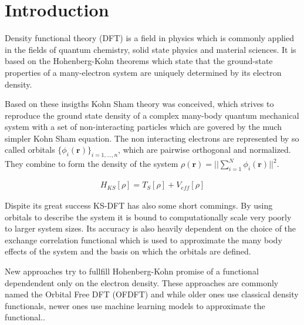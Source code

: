 \chapter{Introduction}

Density functional theory (DFT) is a field in physics which is commonly applied in the fields of quantum chemistry,
solid state physics and material sciences. It is based on the Hohenberg-Kohn theorems \cite{hohenberg_inhomogeneous_1964} which state that the ground-state properties of a many-electron system are uniquely determined by its electron density.

Based on these insigths Kohn Sham theory was conceived, which strives to reproduce the ground state
density of a complex many-body quantum mechanical system with a set of non-interacting particles which are govered by the much simpler Kohn Sham equation. The non interacting electrons are represented by so called orbitals $\{\phi_i (\mathbf{r})\}_{i=1,...,n}$, which are pairwise orthogonal and normalized. They combine to form the density of the system $\rho(\mathbf{r}) = || \sum\limits_{i=1}^N \phi_i(\mathbf{r})||^2$.

\begin{align}
    H_{KS}[\rho ]  = T_S [\rho] + V_{eff}[\rho]
\end{align}

Dispite its great success KS-DFT has also some short commings. By using orbitals to describe the system it is bound to computationally scale very poorly to larger system sizes. Its accuracy is also heavily dependent on the choice of the exchange correlation functional which is used to approximate the many body effects of the system and the basis on which the orbitals are defined.

New approaches try to fullfill Hohenberg-Kohn promise of a functional dependendent only on the electron density. These approaches are commonly named the Orbital Free DFT (OFDFT) and while older ones use classical density functionals\cite{oldofdft}, newer ones use machine learning models to approximate the functional.\cite{Roman}\cite{zhang_m-ofdft_2023}.

